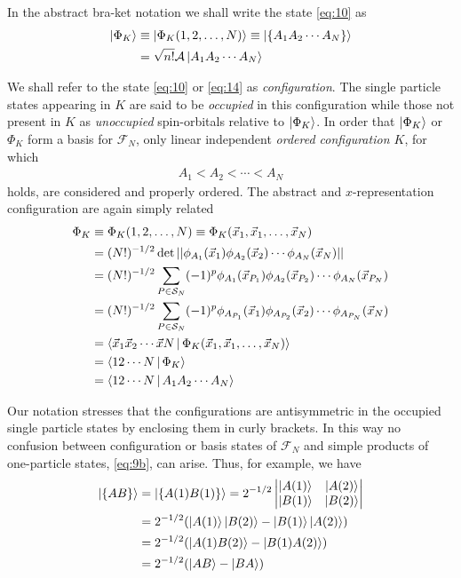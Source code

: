 \documentclass{book}
\renewcommand{\braket}[1]{\Braket{#1}}
\renewcommand{\ket}[1]{\Ket{#1}}
\begin{document}
In the abstract bra-ket notation we shall write the state \eqref{eq:10} as 
\begin{align}
    \ket{\Phi_K} & \equiv \ket{\Phi_K(1,2,\ldots,N)} \equiv \ket{\{A_1A_2\cdots A_N\}}\notag\\
                 & = \sqrt{n!}\mathcal{A}\ket{A_1A_2\cdots A_N}
    \label{eq:14}
\end{align}

We shall refer to the state \eqref{eq:10} or \eqref{eq:14} as \emph{configuration}. The single particle states appearing in $K$ are said to be \emph{occupied} in this configuration while those not present in $K$ as \emph{unoccupied} spin-orbitals relative to $\ket{\Phi_K}$. In order that $\ket{\Phi_K}$ or ${\Phi_K}$ form a basis for $\mathcal{F}_N$, only linear independent \emph{ordered configuration $K$}, for which 
\begin{align}
    A_1<A_2<\cdots<A_N
    \label{eq:15}
\end{align}
holds, are considered and properly ordered. The abstract and $x$-representation configuration are again simply related 
\begin{align}
    \Phi_K & \equiv \Phi_K(1,2,\ldots,N) \equiv \Phi_K(\vec{x}_1,\vec{x}_1,\ldots,\vec{x}_N)\notag\\
    &=(N!)^{-1/2}\det||\phi_{A_1}(\vec{x}_1)\phi_{A_2}(\vec{x}_2)\cdots\phi_{A_N}(\vec{x}_N)|| \notag\\
    &=(N!)^{-1/2}\sum_{P\in \mathcal{S}_N}(-1)^p \phi_{A_1}(\vec{x}_{P_1})\phi_{A_2}(\vec{x}_{P_2})\cdots\phi_{A_N}(\vec{x}_{P_N})\notag\\
    &=(N!)^{-1/2}\sum_{P\in \mathcal{S}_N}(-1)^p \phi_{A_{P_1}}(\vec{x}_1)\phi_{A_{P_2}}(\vec{x}_{2})\cdots\phi_{A_{P_N}}(\vec{x}_{N})\notag\\
    &=\braket{\vec{x}_1\vec{x}_2\cdots\vec{x}N|\Phi_K(\vec{x}_1,\vec{x}_1,\ldots,\vec{x}_N)}\notag\\
    &=\braket{12\cdots N|\Phi_K}\notag\\
    &=\braket{12\cdots N|A_1A_2\cdots A_N}
    \label{eq:16}
\end{align}

Our notation stresses that the configurations are antisymmetric in the occupied single particle states by enclosing them in curly brackets. In this way no confusion between configuration or basis states of $\mathcal{F}_N$ and simple products of one-particle states, \eqref{eq:9b}, can arise. Thus, for example, we have 
\begin{align}
    \ket{\{AB\}}&=\ket{\{A(1)B(1)\}} = 2^{-1/2}
    \begin{vmatrix}
        \ket{A(1)} & \ket{A(2)}\\
        \ket{B(1)} & \ket{B(2)}
    \end{vmatrix} \notag \\
                &=2^{-1/2}(\ket{A(1)}\ket{B(2)}-\ket{B(1)}\ket{A(2)}) \notag \\
                &=2^{-1/2}(\ket{A(1)B(2)}-\ket{B(1)A(2)}) \notag \\
                &=2^{-1/2}(\ket{AB}-\ket{BA})
\end{align}
\end{document}
